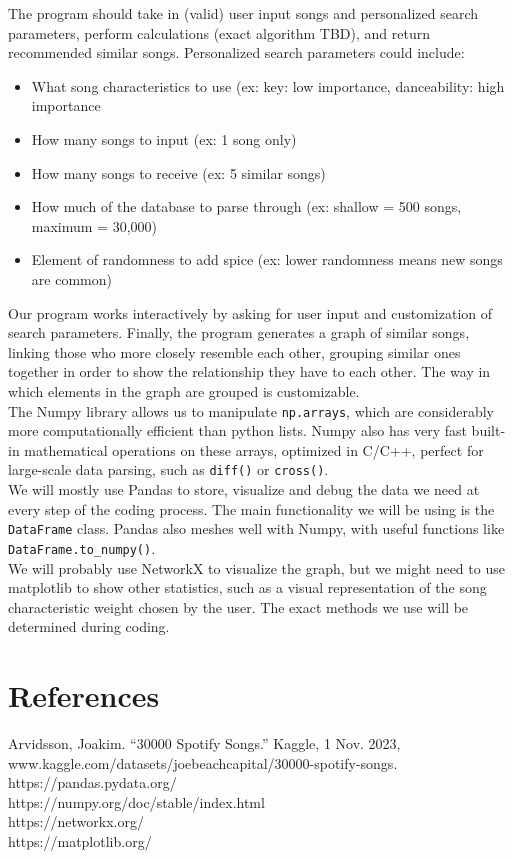 \documentclass[fontsize=11pt]{article}
\begin{document}
The program should take in (valid) user input songs and personalized search parameters, perform calculations (exact algorithm TBD), and return recommended similar songs.
Personalized search parameters could include:
\begin{itemize}
    \item What song characteristics to use (ex: key: low importance, danceability: high importance
    \item How many songs to input (ex: 1 song only)
    \item How many songs to receive (ex: 5 similar songs)
    \item How much of the database to parse through (ex: shallow = 500 songs, maximum = 30,000)
    \item Element of randomness to add spice (ex: lower randomness means new songs are common)
\end{itemize}

Our program works interactively by asking for user input and customization of search parameters. Finally, the program generates a graph of similar songs, linking those who more closely resemble each other, grouping similar ones together in order to show the relationship they have to each other. The way in which elements in the graph are grouped is customizable.\\

The Numpy library allows us to manipulate \texttt{np.arrays}, which are considerably more computationally efficient than python lists. Numpy also has very fast built-in mathematical operations on these arrays, optimized in C/C++, perfect for large-scale data parsing, such as \texttt{diff()} or \texttt{cross()}. \\
We will mostly use Pandas to store, visualize and debug the data we need at every step of the coding process. The main functionality we will be using is the \texttt{DataFrame} class. Pandas also meshes well with Numpy, with useful functions like \texttt{DataFrame.to\_numpy()}.\\
We will probably use NetworkX to visualize the graph, but we might need to use matplotlib to show other statistics, such as a visual representation of the song characteristic weight chosen by the user. The exact methods we use will be determined during coding. 

\section*{References}

Arvidsson, Joakim. “30000 Spotify Songs.” Kaggle, 1 Nov. 2023, www.kaggle.com/datasets/joebeachcapital/30000-spotify-songs. 
\\ https://pandas.pydata.org/
\\ https://numpy.org/doc/stable/index.html
\\ https://networkx.org/
\\ https://matplotlib.org/
\end{document}
